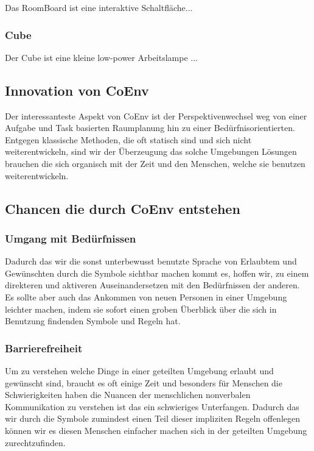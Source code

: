 \documentclass{article}
\begin{document}
Das RoomBoard ist eine interaktive Schaltfläche...

\subsubsection*{Cube}

Der Cube ist eine kleine low-power Arbeitslampe ...

\subsection{Innovation von CoEnv}

Der interessanteste Aspekt von CoEnv ist der Perspektivenwechsel weg von einer Aufgabe und Task basierten Raumplanung hin zu einer Bedürfnisorientierten. Entgegen klassische Methoden, die oft statisch sind und sich nicht weiterentwickeln, sind wir der Überzeugung das solche Umgebungen Lösungen brauchen die sich organisch mit der Zeit und den Menschen, welche sie benutzen weiterentwickeln. 

\subsection{Chancen die durch CoEnv entstehen}

\subsubsection*{Umgang mit Bedürfnissen}
Dadurch das wir die sonst unterbewusst benutzte Sprache von Erlaubtem und Gewünschten durch die Symbole sichtbar machen kommt es, hoffen wir, zu einem direkteren und aktiveren Auseinandersetzen mit den Bedürfnissen der anderen. Es sollte aber auch das Ankommen von neuen Personen in einer Umgebung leichter machen, indem sie sofort einen groben Überblick über die sich in Benutzung findenden Symbole und Regeln hat.
\subsubsection*{Barrierefreiheit}
Um zu verstehen welche Dinge in einer geteilten Umgebung erlaubt und gewünscht sind, braucht es oft einige Zeit und besonders für Menschen die Schwierigkeiten haben die Nuancen der menschlichen nonverbalen Kommunikation zu verstehen ist das ein schwieriges Unterfangen. Dadurch das wir durch die Symbole zumindest einen Teil dieser impliziten Regeln offenlegen können wir es diesen Menschen einfacher machen sich in der geteilten Umgebung zurechtzufinden.
\end{document}
